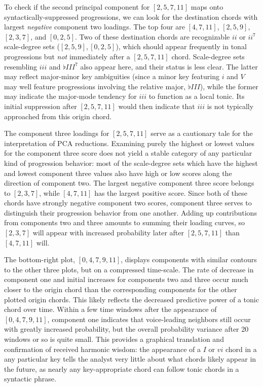 To check if the second principal component for $[2,5,7,11]$ maps onto syntactically-suppressed progressions, we can look for the destination chords with largest \emph{negative} component two loadings.  The top four are $[4,7,11]$, $[2,5,9]$, $[2,3,7]$, and $[0,2,5]$.  Two of these destination chords are recognizable $ii$ or $ii^7$ scale-degree sets ($[2,5,9],[0,2,5]$), which should appear frequently in tonal progressions but \emph{not} immediately after a $[2,5,7,11]$ chord.  Scale-degree sets resembling $iii$ and $\flat III^7$ also appear here, and their status is less clear.  The latter may reflect major-minor key ambiguities  (since a minor key featuring $i$ and $V$ may well feature progressions involving the relative major, $\flat III$), while the former may indicate the major-mode tendency for $iii$ to function as a local tonic.  Its initial suppression after $[2,5,7,11]$ would then indicate that $iii$ is not typically approached from this origin chord.

The component three loadings for $[2,5,7,11]$ serve as a cautionary tale for the interpretation of PCA reductions.  Examining purely the highest or lowest values for the component three score does not yield a stable category of any particular kind of progression behavior: most of the scale-degree sets which have the highest and lowest component three values also have high or low scores along the direction of component two.  The largest negative component three score belongs to $[2,3,7]$, while $[4,7,11]$ has the largest positive score.  Since both of these chords have strongly negative component two scores, component three serves to distinguish their progression behavior from one another.  Adding up contributions from components two and three amounts to summing their loading curves, so $[2,3,7]$ will appear with increased probability later after $[2,5,7,11]$ than $[4,7,11]$ will.%

The bottom-right plot, $[0,4,7,9,11]$, displays components with similar contours to the other three plots, but on a compressed time-scale.  The rate of decrease in component one and initial increases for components two and three occur much closer to the origin chord than the corresponding components for the other plotted origin chords.  This likely reflects the decreased predictive power of a tonic chord over time.  Within a few time windows after the appearance of $[0,4,7,9,11]$, component one indicates that voice-leading neighbors still occur with greatly increased probability, but the overall probability variance after 20 windows or so is quite small.  This provides a graphical translation and confirmation of received harmonic wisdom: the appearance of a $I$ or $vi$ chord in a any particular key tells the analyst very little about what chords likely appear in the future, as nearly any key-appropriate chord can follow tonic chords in a syntactic phrase.

